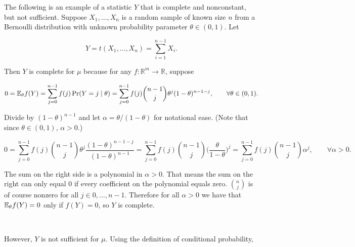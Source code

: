 \begin{example} The following is an example of a statistic \(Y\) that is complete and nonconstant, but not sufficient. Suppose \(X_1, \ldots, X_n\) is a random sample of known size \(n\) from a Bernoulli distribution with unknown probability parameter \(\theta \in (0,1)\). Let

\[
Y = t(X_1, \ldots, X_n) =  \sum_{i=1}^{n-1} X_i.
\]

Then \(Y\) is complete for \(\mu\) because for any \(f: \mathbb{R}^m \to \mathbb{R}\), suppose


\[
0 = \E_\theta f(Y)  = \sum_{j=0}^{n-1} f(j)\Pr(Y = j \mid \theta) = \sum_{j=0}^{n-1} f(j) \binom{n-1}{j} \theta^j(1 - \theta)^{n-1-j}, \qquad \forall \theta \in (0,1).
\]

%
%

Divide by \((1-\theta)^{n-1}\) and let \(\alpha = \theta/(1-\theta)\) for notational ease. (Note that since \(\theta \in (0,1)\), \(\alpha > 0\).)

\[
0 = \sum_{j=0}^{n-1} f(j) \binom{n-1}{j} \theta^j \frac{(1 - \theta)^{n-1-j} }{(1 - \theta)^{n-1}} = \sum_{j=0}^{n-1} f(j) \binom{n-1}{j} \bigg( \frac{\theta}{1-\theta} \bigg) ^j  = \sum_{j=0}^{n-1} f(j) \binom{n-1}{j} \alpha ^j    , \qquad \forall \alpha > 0.
\]


The sum on the right side is a polynomial in \(\alpha > 0\). That means the sum on the right can only equal 0 if every coefficient on the polynomial equals zero. \(\binom{n}{j}\) is of course nonzero for all \(j \in 0, \ldots, n-1\). Therefore for all \(\alpha > 0\) we have that \(\E_\theta f(Y) = 0\) only if \(f(Y) = 0\), so \(Y\) is complete.

\

However, \(Y\) is not sufficient for \(\mu\). Using the definition of conditional probability, 

%


\end{example}
